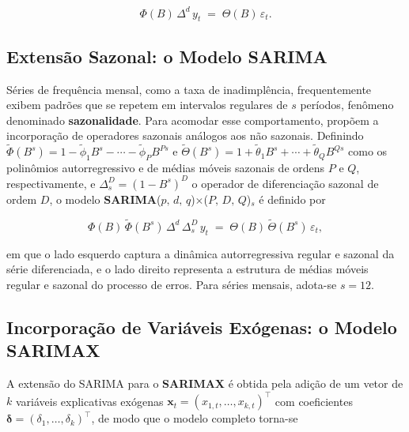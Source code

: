 \begin{equation}
  \Phi(B)\,\Delta^d\,y_t \;=\; \Theta(B)\,\varepsilon_t.
  \label{eq:arima}
\end{equation}
 
\subsection{Extensão Sazonal: o Modelo SARIMA}
\label{sec:sarima}
 
Séries de frequência mensal, como a taxa de inadimplência, frequentemente
exibem padrões que se repetem em intervalos regulares de \(s\) períodos,
fenômeno denominado \textbf{sazonalidade}. Para acomodar esse comportamento,
\citet{box2015} propõem a incorporação de operadores sazonais análogos aos
não sazonais. Definindo \(\tilde{\Phi}(B^s) = 1 - \tilde{\phi}_1 B^s - \cdots - \tilde{\phi}_P B^{Ps}\)
e \(\tilde{\Theta}(B^s) = 1 + \tilde{\theta}_1 B^s + \cdots + \tilde{\theta}_Q B^{Qs}\)
como os polinômios autorregressivo e de médias móveis sazonais de ordens
\(P\) e \(Q\), respectivamente, e \(\Delta_s^D = (1-B^s)^D\) o operador de
diferenciação sazonal de ordem \(D\), o modelo
\textbf{SARIMA}(\(p,\,d,\,q\))\(\times\)(\(P,\,D,\,Q\))\(_s\) é definido
por
 
\begin{equation}
  \Phi(B)\,\tilde{\Phi}(B^s)\,\Delta^d\,\Delta_s^D\,y_t
  \;=\;
  \Theta(B)\,\tilde{\Theta}(B^s)\,\varepsilon_t,
  \label{eq:sarima}
\end{equation}
 
\noindent
em que o lado esquerdo captura a dinâmica autorregressiva regular e sazonal da
série diferenciada, e o lado direito representa a estrutura de médias móveis
regular e sazonal do processo de erros. Para séries mensais, adota-se
\(s = 12\).
 
\subsection{Incorporação de Variáveis Exógenas: o Modelo SARIMAX}
\label{sec:sarimax_form}
 
A extensão do SARIMA para o \textbf{SARIMAX} é obtida pela adição de um
vetor de \(k\) variáveis explicativas exógenas \(\mathbf{x}_t = (x_{1,t},
\ldots, x_{k,t})^\top\) com coeficientes \(\boldsymbol{\delta} = (\delta_1,
\ldots, \delta_k)^\top\), de modo que o modelo completo torna-se
 
